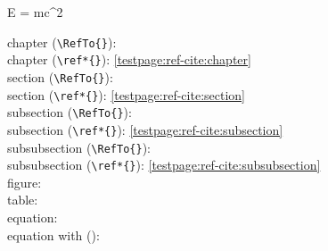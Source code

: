E = mc^2\EquationEnd

\EndChapter


chapter (\verb|\RefTo{}|): \\
chapter (\verb|\ref*{}|): \ref*{testpage:ref-cite:chapter}\\

section (\verb|\RefTo{}|): \\
section (\verb|\ref*{}|): \ref*{testpage:ref-cite:section}\\

subsection (\verb|\RefTo{}|): \\
subsection (\verb|\ref*{}|): \ref*{testpage:ref-cite:subsection}\\

subsubsection (\verb|\RefTo{}|): \\
subsubsection (\verb|\ref*{}|): \ref*{testpage:ref-cite:subsubsection}\\

figure: \\
table: \\
equation: \\
equation with (): \\

\begin{comment}
\end{comment}
\EndChapter
